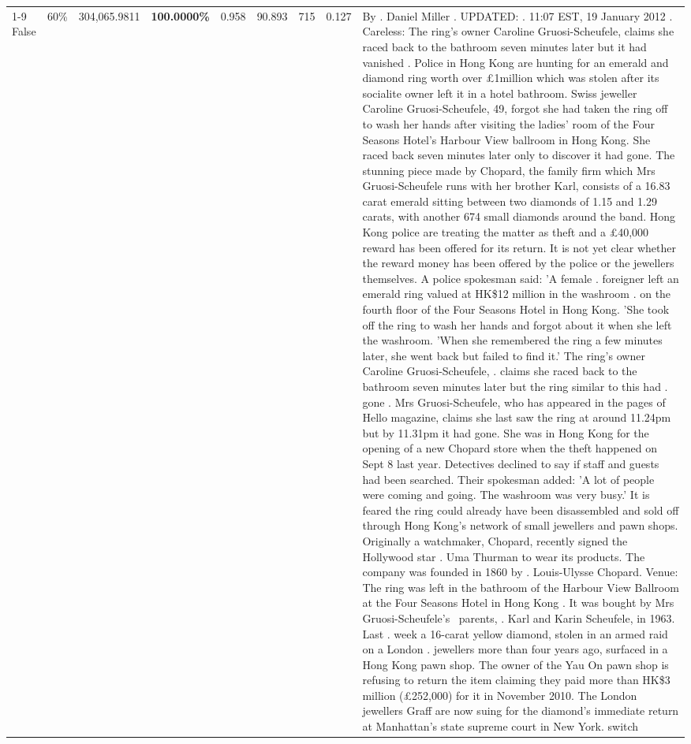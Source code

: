 \begin{table}[H]
\begin{tabular}{lllrlllll}
\cline{1-9} \cline{2-9}
False & 60\% & \color{red} 304,065.9811 & \bfseries \color{red} 100.0000\% & 0.958 & 90.893 & 715 & 0.127 & By . Daniel Miller . UPDATED: . 11:07 EST, 19 January 2012 . Careless: The ring's owner Caroline Gruosi-Scheufele, claims she raced back to the bathroom seven minutes later but it had vanished . Police in Hong Kong are hunting for an emerald and diamond ring worth over £1million which was stolen after its socialite owner left it in a hotel bathroom. Swiss jeweller Caroline Gruosi-Scheufele, 49, forgot she had taken the ring off to wash her hands after visiting the ladies' room of the Four Seasons Hotel's Harbour View ballroom in Hong Kong. She raced back seven minutes later only to discover it had gone. The stunning piece made by Chopard, the family firm which Mrs Gruosi-Scheufele runs with her brother Karl, consists of a 16.83 carat emerald sitting between two diamonds of 1.15 and 1.29 carats, with another 674 small diamonds around the band. Hong Kong police are treating the matter as theft and a £40,000 reward has been offered for its return. It is not yet clear whether the reward money has been offered by the police or the jewellers themselves. A police spokesman said: 'A female . foreigner left an emerald ring valued at HK\$12 million in the washroom . on the fourth floor of the Four Seasons Hotel in Hong Kong. 'She took off the ring to wash her hands and forgot about it when she left the washroom. 'When she remembered the ring a few minutes later, she went back but failed to find it.' The ring's owner Caroline Gruosi-Scheufele, . claims she raced back to the bathroom seven minutes later but the ring similar to this had . gone . Mrs Gruosi-Scheufele, who has appeared in the pages of Hello magazine, claims she last saw the ring at around 11.24pm but by 11.31pm it had gone. She was in Hong Kong for the opening of a new Chopard store when the theft happened on Sept 8 last year. Detectives declined to say if staff and guests had been searched. Their spokesman added: 'A lot of people were coming and going. The washroom was very busy.' It is feared the ring could already have been disassembled and sold off through Hong Kong's network of small jewellers and pawn shops. Originally a watchmaker, Chopard, recently signed the Hollywood star . Uma Thurman to wear its products. The company was founded in 1860 by . Louis-Ulysse Chopard. Venue: The ring was left in the bathroom of the Harbour View Ballroom at the Four Seasons Hotel in Hong Kong . It was bought by Mrs Gruosi-Scheufele's  parents, . Karl and Karin Scheufele, in 1963. Last . week a 16-carat yellow diamond, stolen in an armed raid on a London . jewellers more than four years ago, surfaced in a Hong Kong pawn shop. The owner of the Yau On pawn shop is refusing to return the item claiming they paid more than HK\$3 million (£252,000) for it in November 2010. The London jewellers Graff are now suing for the diamond’s immediate return at Manhattan’s state supreme court in New York. switch \\

\end{tabular}
\end{table}
